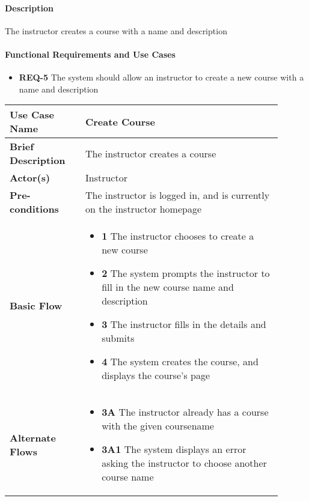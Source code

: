 \documentclass{article}
\begin{document}
\paragraph{Description} The instructor creates a course with a name and description


\paragraph{Functional Requirements and Use Cases}
\begin{itemize}
  \item \textbf{REQ-5} The system should allow an instructor to create a new course with a name and description
\end{itemize}

\vspace{0.1in}

\begin{tabular}{| p{0.25\linewidth} | p{0.65\linewidth} |}
  \hline
  \textbf{Use Case Name} & Create Course \\
  \hline
  \textbf{Brief Description} & The instructor creates a course \\
  \hline
  \textbf{Actor(s)} & Instructor \\
  \hline
  \textbf{Pre-conditions} & The instructor is logged in, and is currently on the instructor homepage\\
  \hline
  \textbf{Basic Flow} & \begin{itemize}
    \item[] \textbf{1} The instructor chooses to create a new course
    \item[] \textbf{2} The system prompts the instructor to fill in the new course name and description
    \item[] \textbf{3} The instructor fills in the details and submits
    \item[] \textbf{4} The system creates the course, and displays the course's page
  \end{itemize}\\
  \hline
  \textbf{Alternate Flows} & \begin{itemize}
    \item[] \textbf{3A} The instructor already has a course with the given coursename
    \item[] \textbf{3A1} The system displays an error asking the instructor to choose another course name
  \end{itemize} \\
  \hline
\end{tabular}
\end{document}
